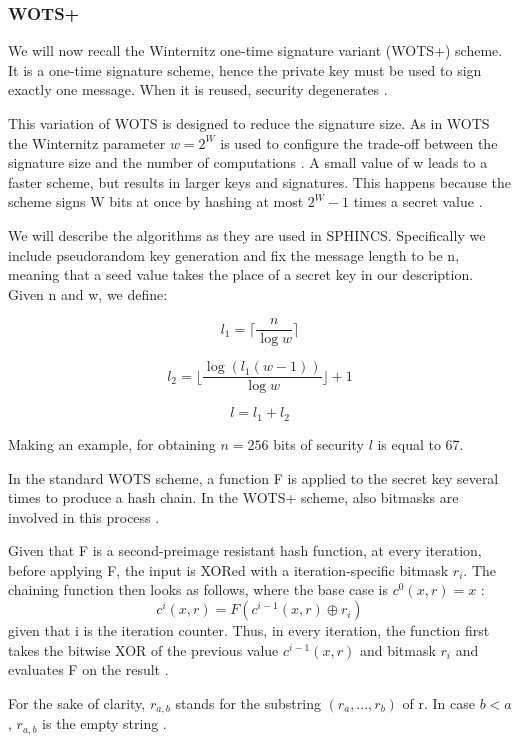 \documentclass[a4paper,12pt]{article}
\begin{document}
\subsubsection{WOTS+}

We will now recall the Winternitz one-time signature variant (WOTS+) scheme. It is a one-time signature scheme, hence the private key must be used to sign exactly one message. When it is reused, security degenerates \cite{3_SPHINCS_secondpaper}.

This variation of WOTS is designed to reduce the signature size.
As in WOTS the Winternitz parameter $w = 2^{W}$ is used to configure the trade-off between the signature size and the number of computations \cite{4_wings}.
A small value of w leads to a faster scheme, but results in larger keys and signatures. This happens because the scheme signs W bits at once by hashing at most $2^{W} - 1$ times a secret value \cite{12_faultinjection}.

We will describe the algorithms as they are used in SPHINCS. Specifically we include pseudorandom key generation and fix the message length to be n, meaning that a seed value takes the place of a secret key in our description. 
Given n and w, we define:

$$l_{1} = \lceil {\frac{n}{\log w}} \rceil $$

$$l_{2} = \lfloor \frac{\log (l_{1}(w-1))}{\log w} \rfloor + 1$$

$$l = l_{1} + l_{2}$$

Making an example, for obtaining $n=256$ bits of security $l$ is equal to 67.

In the standard WOTS scheme, a function F is applied to the secret key several times to produce a hash chain. In the WOTS+ scheme, also bitmasks are involved in this process \cite{8_ARM}.

Given that F is a second-preimage resistant hash function, at every iteration, before applying F, the input is XORed with a iteration-specific bitmask $r_{i}$. The chaining function then looks as follows, where the base case is $c^{0}(x,r) = x$  \cite{8_ARM}:
$$c^{i}(x,r) = F(c^{i-1}(x, r) \oplus r_{i})$$
given that i is the iteration counter.
Thus, in every iteration, the function first takes the bitwise XOR of the previous value $c^{i-1}(x, r)$ and bitmask $r_{i}$ and evaluates F on the result \cite{1_sphincspaper}.

For the sake of clarity, $r_{a,b}$ stands for the substring $(r_{a} , . . . , r_{b})$ of r. In case $b < a$, $r_{a,b}$ is the empty string \cite{1_sphincspaper}.
\end{document}
